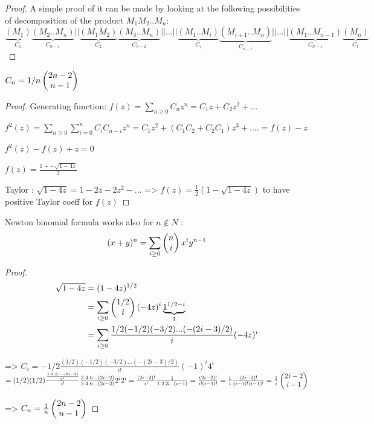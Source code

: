 \begin{proof} A simple proof of it can be made by looking at the following possibilities of decomposition of the product $M_1M_2..M_n$: 
$$\underbrace{(M_1)}_{C_1}\underbrace{(M_2..M_n)}_{C_{n-1}} || \underbrace{(M_1M_2)}_{C_2}\underbrace{(M_3..M_n)}_{C_{n-2}}|| ...|| \underbrace{(M_1..M_i)}_{C_i}\underbrace{(M_{i+1}..M_n)}_{C_{n-i}}|| ...|| \underbrace{(M_1..M_{n-1})}_{C_{n-1}}\underbrace{(M_n)}_{C_1}$$
\end{proof}

\begin{theorem}
$C_n = 1/n \left( \begin{matrix} 2n-2\\ n-1\end{matrix} \right)$
\end{theorem}

\begin{proof}
Generating function:
$f(z) = \sum_{n\geq 0} C_n z^n = C_1z+C_2z^2 +...$

$f^2(z) = \sum_{n \geq 0}\sum_{i=0}^{n}C_i C_{n-i} z^n = C_1z^2+(C_1C_2+C_2C_1)z^3+....=f(z) - z$

$f^2(z)-f(z)+z = 0$

$f(z)=\frac{1+- \sqrt{1-4z}}{2}$

Taylor : $\sqrt{1-4z}  = 1-2z-2z^2-...$
=> $f(z) = \frac{1}{2}(1-\sqrt{1-4z})$ to have positive Taylor coeff for $f(z)$
\end{proof}

\begin{theorem}
Newton binomial formula works also for $n\not\in N$ : $$(x+y)^n = \sum_{i\geq 0} \left( \begin{matrix} n\\ i\end{matrix} \right) x^i y^{n-1}$$
\end{theorem}

\begin{proof}
\begin{align*}
\sqrt{1-4z} &= (1-4z)^{1/2}\\
&= \sum_{i\geq 0} \left( \begin{matrix} 1/2\\ i\end{matrix} \right)(-4z)^i \underbrace{1^{1/2-i}}_{1}\\
&= \sum_{i\geq 0} \frac{1/2(-1/2)(-3/2) ... (-(2i-3)/2)}{i} (-4z)^i
\end{align*}

=> $C_i = -1/2 \frac{(1/2)(-1/2)(-3/2)...(-(2i-3)/2)}{i!} (-1)^i 4^i$
$ =  (1/2) (1/2) \frac{\frac{1.3.5....(2i-3)}{2^i}}{i!}\frac{2.4.6...(2i-2)}{2.4.6...(2i-2)} 2^i 2^i = \frac{(2i-2)!}{i!}\frac{1}{1.2.3...(i-1)}=\frac{(2i-2)!}{i!(i-1)!} = \frac{1}{i}\frac{(2i-2)!}{(i-1)!(i-1)!}= \frac{1}{i}\left( \begin{matrix} 2i-2\\ i-1\end{matrix} \right)$

=> $C_n = \frac{1}{n}\left( \begin{matrix} 2n-2\\ n-1\end{matrix} \right)$
\end{proof}

